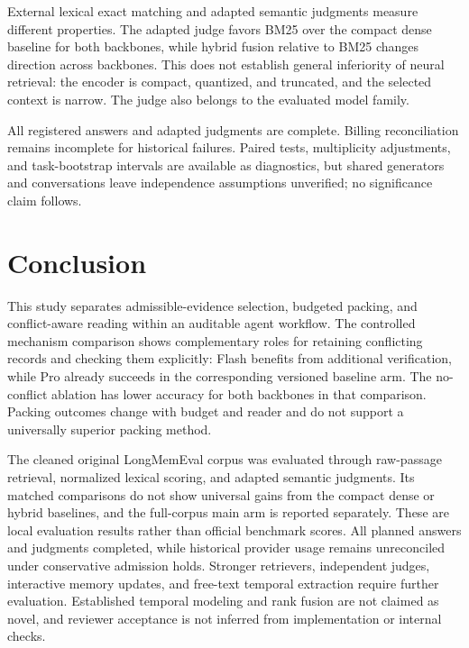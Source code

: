 \documentclass{article}
\begin{document}
External lexical exact matching and adapted semantic judgments measure different properties. The adapted judge favors BM25 over the compact dense baseline for both backbones, while hybrid fusion relative to BM25 changes direction across backbones. This does not establish general inferiority of neural retrieval: the encoder is compact, quantized, and truncated, and the selected context is narrow. The judge also belongs to the evaluated model family.

All registered answers and adapted judgments are complete. Billing reconciliation remains incomplete for historical failures. Paired tests, multiplicity adjustments, and task-bootstrap intervals are available as diagnostics, but shared generators and conversations leave independence assumptions unverified; no significance claim follows.
\section{Conclusion}
This study separates admissible-evidence selection, budgeted packing, and conflict-aware reading within an auditable agent workflow. The controlled mechanism comparison shows complementary roles for retaining conflicting records and checking them explicitly: Flash benefits from additional verification, while Pro already succeeds in the corresponding versioned baseline arm. The no-conflict ablation has lower accuracy for both backbones in that comparison. Packing outcomes change with budget and reader and do not support a universally superior packing method.

The cleaned original LongMemEval corpus was evaluated through raw-passage retrieval, normalized lexical scoring, and adapted semantic judgments. Its matched comparisons do not show universal gains from the compact dense or hybrid baselines, and the full-corpus main arm is reported separately. These are local evaluation results rather than official benchmark scores. All planned answers and judgments completed, while historical provider usage remains unreconciled under conservative admission holds. Stronger retrievers, independent judges, interactive memory updates, and free-text temporal extraction require further evaluation. Established temporal modeling and rank fusion are not claimed as novel, and reviewer acceptance is not inferred from implementation or internal checks.
\end{document}
